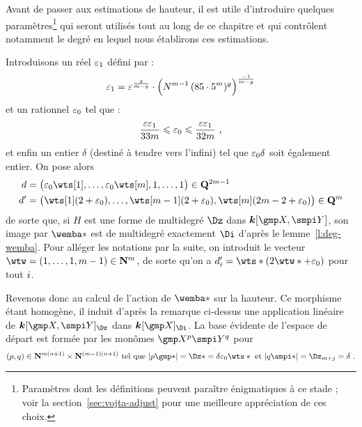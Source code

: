 Avant de passer aux estimations de hauteur, il est utile d'introduire quelques
paramètres\footnote{Paramètres dont les définitions peuvent paraître
  énigmatiques à ce stade ; voir la section~\ref{sec:vojta-adjust} pour une
  meilleure appréciation de ces choix.} qui seront utilisés tout au long de ce
chapitre et qui contrôlent notamment le degré en lequel nous établirons ces
estimations.

Introduisons un réel \( \varepsilon\sb1 \) défini par :
\begin{equation} \label{e:def-epsi}
  \varepsilon\sb1
  =
  \varepsilon^{\frac{g}{m-g}}
  \cdot \Bigl(
    N^{m-1}
    \, (85 \cdot 5^m)^g
  \Bigr)^{\frac{-1}{m-g}}
\end{equation}
et un rationnel \( \varepsilon\sb0 \) tel que :
\begin{equation} \label{e:def-epsz}
  \frac{\varepsilon \varepsilon\sb1}{33m}
  \leqslant \varepsilon\sb0 \leqslant
  \frac{\varepsilon \varepsilon\sb1}{32m}
  \text{ ,}
\end{equation}
et enfin un entier \( \delta \) (destiné à tendre vers l'infini) tel que \(
  \varepsilon\sb0 \delta \) soit également entier. On pose alors
\begin{equation} \label{e:d-dp-def}
  \begin{aligned}
    d & = \bigl(
      \epsz \wts[1],
      \dots,
      \epsz \wts[\puiss],
      1, \dots, 1
    \bigr) \in \Q^{2\puiss-1}
    \\
    d' & = \bigl(
      \wts[1] (2 + \epsz),
      \dots,
      \wts[\puiss-1] (2 + \epsz),
      \wts[\puiss] (2\puiss - 2 + \epsz)
    \bigr) \in \Q^\puiss
  \end{aligned}
\end{equation}
de sorte que, si \( H \) est une forme de multidegré \( \Dz \) dans \(
  \cdn[\vmp, \vmpi] \), son image par \( \wemba* \) est de multidegré
exactement \( \Di \) d'après le lemme~\ref{l:deg-wemba}. Pour alléger les
notations par la suite, on introduit le vecteur \( \wtw = (1, \dots, 1, \puiss
  - 1) \in \N^\puiss \), de sorte qu'on a \( d'_\fct = \wts* (2 \wtw* + \epsz)
\) pour tout \( i \).

\medskip

Revenons donc au calcul de l'action de \( \wemba* \) sur la hauteur. Ce
morphisme étant homogène, il induit d'après la remarque ci-dessus une
application linéaire de \( \cdn [\vmp, \vmpi]_\Dz \) dans \( \cdn [\vmp]_\Di
\).  La base évidente de l'espace de départ est formée par les monômes \(
  \vmp^p \vmpi^q \) pour
\begin{equation}
  (p, q)
  \in \N^{\puiss (\dimp+1)} \times \N^{(\puiss-1) (\dimp+1)}
  \text{ tel que }
  \lgr{p\mexp*} = \Dz* = \delta \epsz \wts*
  \text{ et }
  \lgr{q\mexpi*} = \Dz_{\puiss + \fcti} = \delta
  \pmm.
\end{equation}

